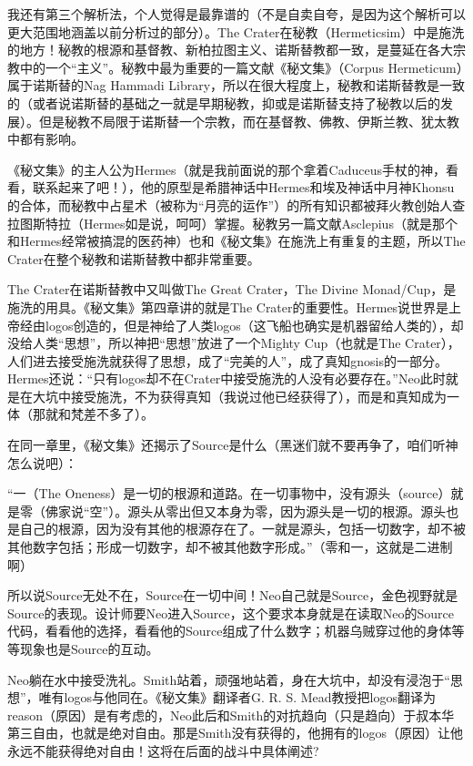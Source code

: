 \documentclass[UTF8]{ctexart}
\begin{document}
我还有第三个解析法，个人觉得是最靠谱的（不是自卖自夸，是因为这个解析可以更大范围地涵盖以前分析过的部分）。The Crater在秘教（Hermeticsim）中是施洗的地方！秘教的根源和基督教、新柏拉图主义、诺斯替教都一致，是蔓延在各大宗教中的一个“主义”。秘教中最为重要的一篇文献《秘文集》（Corpus Hermeticum）属于诺斯替的Nag Hammadi Library，所以在很大程度上，秘教和诺斯替教是一致的（或者说诺斯替的基础之一就是早期秘教，抑或是诺斯替支持了秘教以后的发展）。但是秘教不局限于诺斯替一个宗教，而在基督教、佛教、伊斯兰教、犹太教中都有影响。

《秘文集》的主人公为Hermes（就是我前面说的那个拿着Caduceus手杖的神，看看，联系起来了吧！），他的原型是希腊神话中Hermes和埃及神话中月神Khonsu的合体，而秘教中占星术（被称为“月亮的运作”）的所有知识都被拜火教创始人查拉图斯特拉（Hermes如是说，呵呵）掌握。秘教另一篇文献Asclepius（就是那个和Hermes经常被搞混的医药神）也和《秘文集》在施洗上有重复的主题，所以The Crater在整个秘教和诺斯替教中都非常重要。

The Crater在诺斯替教中又叫做The Great Crater，The Divine Monad/Cup，是施洗的用具。《秘文集》第四章讲的就是The Crater的重要性。Hermes说世界是上帝经由logos创造的，但是神给了人类logos（这飞船也确实是机器留给人类的），却没给人类“思想”，所以神把“思想”放进了一个Mighty Cup（也就是The Crater），人们进去接受施洗就获得了思想，成了“完美的人”，成了真知gnosis的一部分。Hermes还说：“只有logos却不在Crater中接受施洗的人没有必要存在。”Neo此时就是在大坑中接受施洗，不为获得真知（我说过他已经获得了），而是和真知成为一体（那就和梵差不多了）。

在同一章里，《秘文集》还揭示了Source是什么（黑迷们就不要再争了，咱们听神怎么说吧）：

“一（The Oneness）是一切的根源和道路。在一切事物中，没有源头（source）就是零（佛家说“空”）。源头从零出但又本身为零，因为源头是一切的根源。源头也是自己的根源，因为没有其他的根源存在了。一就是源头，包括一切数字，却不被其他数字包括；形成一切数字，却不被其他数字形成。”（零和一，这就是二进制啊）

所以说Source无处不在，Source在一切中间！Neo自己就是Source，金色视野就是Source的表现。设计师要Neo进入Source，这个要求本身就是在读取Neo的Source代码，看看他的选择，看看他的Source组成了什么数字；机器乌贼穿过他的身体等等现象也是Source的互动。

Neo躺在水中接受洗礼。Smith站着，顽强地站着，身在大坑中，却没有浸泡于“思想”，唯有logos与他同在。《秘文集》翻译者G. R. S. Mead教授把logos翻译为reason（原因）是有考虑的，Neo此后和Smith的对抗趋向（只是趋向）于叔本华第三自由，也就是绝对自由。那是Smith没有获得的，他拥有的logos（原因）让他永远不能获得绝对自由！这将在后面的战斗中具体阐述?
\end{document}
